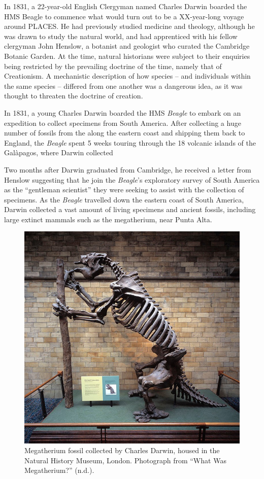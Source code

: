 \documentclass[
]{book}
\begin{document}
In 1831, a 22-year-old English Clergyman named Charles Darwin boarded the HMS Beagle to commence what would turn out to be a XX-year-long voyage around PLACES. He had previously studied medicine and theology, although he was drawn to study the natural world, and had apprenticed with his fellow clergyman John Henslow, a botanist and geologist who curated the Cambridge Botanic Garden. At the time, natural historians were subject to their enquiries being restricted by the prevailing doctrine of the time, namely that of Creationism. A mechanistic description of how species -- and individuals within the same species -- differed from one another was a dangerous idea, as it was thought to threaten the doctrine of creation.

In 1831, a young Charles Darwin boarded the HMS \emph{Beagle} to embark on an expedition to collect specimens from South America. After collecting a huge number of fossils from the along the eastern coast and shipping them back to England, the \emph{Beagle} spent 5 weeks touring through the 18 volcanic islands of the Galàpagos, where Darwin collected

Two months after Darwin graduated from Cambridge, he received a letter from Henslow suggesting that he join the \emph{Beagle}'s exploratory survey of South America as the ``gentleman scientist'' they were seeking to assist with the collection of specimens. As the \emph{Beagle} travelled down the eastern coast of South America, Darwin collected a vast amount of living specimens and ancient fossils, including large extinct mammals such as the megatherium, near Punta Alta.



\begin{figure}
\includegraphics[width=1\linewidth]{figs/introduction/megatherium} \caption{Megatherium fossil collected by Charles Darwin, housed in the Natural History Museum, London. Photograph from {``What Was {Megatherium}?''} (n.d.).}\label{fig:megatherium}
\end{figure}
\end{document}
